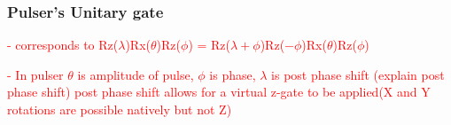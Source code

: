  \subsubsection{Pulser's Unitary gate}
 \textcolor{red}{ -  corresponds to Rz($\lambda$)Rx($\theta$)Rz($\phi$) = Rz($\lambda + \phi$)Rz($-\phi$)Rx($\theta$)Rz($\phi$)}

 \textcolor{red}{- In pulser $\theta$ is amplitude of pulse, $\phi$ is phase, $\lambda$ is post phase shift (explain post phase shift)}
 \textcolor{red}{post phase shift allows for a virtual z-gate to be applied(X and Y rotations are possible natively but not Z)}